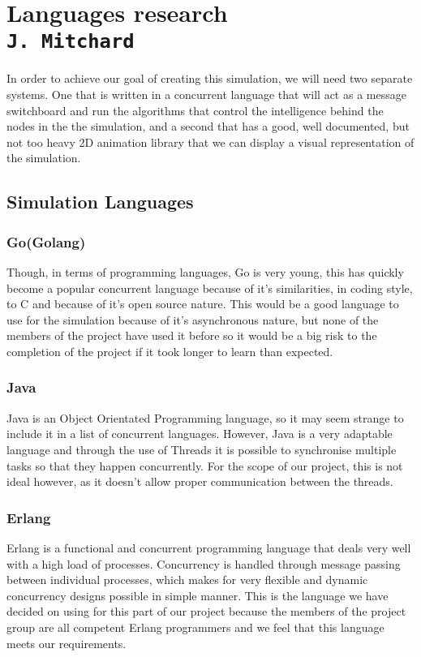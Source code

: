 \pagestyle{empty}

\section{Languages research\\{\small\tt J.~Mitchard}}
In order to achieve our goal of creating this simulation, we will need two separate systems. One that is written in a concurrent language that will act as a message switchboard and run the algorithms that control the intelligence behind the  nodes in the the simulation, and a second that has a good, well documented, but not too heavy 2D animation library that we can display a visual representation of the simulation.

\subsection{Simulation Languages}
\subsubsection{Go(Golang)}
Though, in terms of programming languages, Go is very young, this has quickly become a popular concurrent language because of it’s similarities, in coding style, to C and because of it’s open source nature. This would be a good language to use for the simulation because of it’s asynchronous nature, but none of the members of the project have used it before so it would be a big risk to the completion of the project if it took longer to learn than expected.
\subsubsection{Java}
Java is an Object Orientated Programming language, so it may seem strange to include it in a list of concurrent languages. However, Java is a very adaptable language and through the use of Threads it is possible to synchronise multiple tasks so that they happen concurrently. For the scope of our project, this is not ideal however, as it doesn’t allow proper communication between the threads.

\subsubsection{Erlang}
Erlang is a functional and concurrent programming language that deals very well with a high load of processes. Concurrency is handled through message passing between individual processes, which makes for very flexible and dynamic concurrency designs possible in simple manner. This is the language we have decided on using for this part of our project because the members of the project group are all competent  Erlang programmers and we feel that this language meets our requirements.
